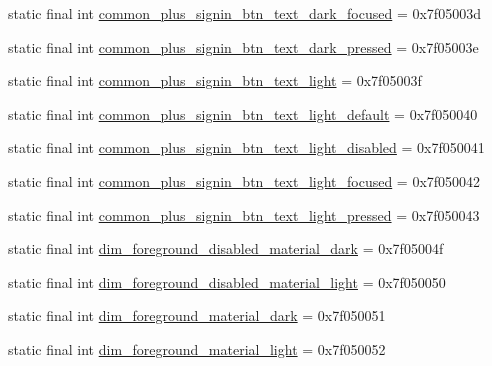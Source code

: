 \begin{DoxyCompactItemize}
\item 
static final int \mbox{\hyperlink{classcom_1_1google_1_1android_1_1gms_1_1R_1_1color_ac2b9c381e8e1785ed126b7aee5e3c3e8}{common\+\_\+plus\+\_\+signin\+\_\+btn\+\_\+text\+\_\+dark\+\_\+focused}} = 0x7f05003d
\item 
static final int \mbox{\hyperlink{classcom_1_1google_1_1android_1_1gms_1_1R_1_1color_ad6bdaba9b72f6163a3272263be2f360f}{common\+\_\+plus\+\_\+signin\+\_\+btn\+\_\+text\+\_\+dark\+\_\+pressed}} = 0x7f05003e
\item 
static final int \mbox{\hyperlink{classcom_1_1google_1_1android_1_1gms_1_1R_1_1color_a6fdce594e492ded885072b658aabf574}{common\+\_\+plus\+\_\+signin\+\_\+btn\+\_\+text\+\_\+light}} = 0x7f05003f
\item 
static final int \mbox{\hyperlink{classcom_1_1google_1_1android_1_1gms_1_1R_1_1color_ab2f9d00a2d1584932ca9b2abe298320e}{common\+\_\+plus\+\_\+signin\+\_\+btn\+\_\+text\+\_\+light\+\_\+default}} = 0x7f050040
\item 
static final int \mbox{\hyperlink{classcom_1_1google_1_1android_1_1gms_1_1R_1_1color_a11581247996cc6b36bacfc2b1654bc9e}{common\+\_\+plus\+\_\+signin\+\_\+btn\+\_\+text\+\_\+light\+\_\+disabled}} = 0x7f050041
\item 
static final int \mbox{\hyperlink{classcom_1_1google_1_1android_1_1gms_1_1R_1_1color_a853a04dba8e54d9404fe5b7671891b2f}{common\+\_\+plus\+\_\+signin\+\_\+btn\+\_\+text\+\_\+light\+\_\+focused}} = 0x7f050042
\item 
static final int \mbox{\hyperlink{classcom_1_1google_1_1android_1_1gms_1_1R_1_1color_a3c24add5d6df6cab9a61e51f513c5876}{common\+\_\+plus\+\_\+signin\+\_\+btn\+\_\+text\+\_\+light\+\_\+pressed}} = 0x7f050043
\item 
static final int \mbox{\hyperlink{classcom_1_1google_1_1android_1_1gms_1_1R_1_1color_a43ac93e6c3c280f7d2fa00774b55f1aa}{dim\+\_\+foreground\+\_\+disabled\+\_\+material\+\_\+dark}} = 0x7f05004f
\item 
static final int \mbox{\hyperlink{classcom_1_1google_1_1android_1_1gms_1_1R_1_1color_a3ec8fabfea4aae6b1251d1c55734c261}{dim\+\_\+foreground\+\_\+disabled\+\_\+material\+\_\+light}} = 0x7f050050
\item 
static final int \mbox{\hyperlink{classcom_1_1google_1_1android_1_1gms_1_1R_1_1color_a8d4131bda00d409f32263a9b13da2277}{dim\+\_\+foreground\+\_\+material\+\_\+dark}} = 0x7f050051
\item 
static final int \mbox{\hyperlink{classcom_1_1google_1_1android_1_1gms_1_1R_1_1color_ae735a610b0eb568807bd18f6ebbdc1be}{dim\+\_\+foreground\+\_\+material\+\_\+light}} = 0x7f050052

\end{DoxyCompactItemize}
